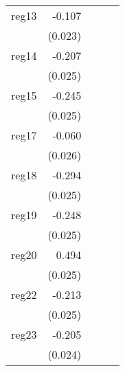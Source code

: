 {\begin{longtable}{l*{4}{D{.}{.}{-1}}}
\addlinespace
reg13       &      -0.107\sym{***}&                     &                     &                     \\
            &     (0.023)         &                     &                     &                     \\
\addlinespace
reg14       &      -0.207\sym{***}&                     &                     &                     \\
            &     (0.025)         &                     &                     &                     \\
\addlinespace
reg15       &      -0.245\sym{***}&                     &                     &                     \\
            &     (0.025)         &                     &                     &                     \\
\addlinespace
reg17       &      -0.060\sym{*}  &                     &                     &                     \\
            &     (0.026)         &                     &                     &                     \\
\addlinespace
reg18       &      -0.294\sym{***}&                     &                     &                     \\
            &     (0.025)         &                     &                     &                     \\
\addlinespace
reg19       &      -0.248\sym{***}&                     &                     &                     \\
            &     (0.025)         &                     &                     &                     \\
\addlinespace
reg20       &       0.494\sym{***}&                     &                     &                     \\
            &     (0.025)         &                     &                     &                     \\
\addlinespace
reg22       &      -0.213\sym{***}&                     &                     &                     \\
            &     (0.025)         &                     &                     &                     \\
\addlinespace
reg23       &      -0.205\sym{***}&                     &                     &                     \\
            &     (0.024)         &                     &                     &                     \\

\end{longtable}}
